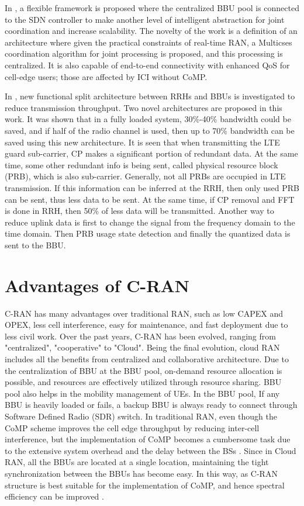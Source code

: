 \begin{multicols}{2}
In \cite{art3-key30}, a flexible framework is proposed where the centralized BBU pool is connected to the SDN controller to make another level of intelligent abstraction for joint coordination and increase scalability. The novelty of the work is a definition of an architecture where given the practical constraints of real-time RAN, a Multicses coordination algorithm for joint processing is proposed, and this processing is centralized. It is also capable of end-to-end connectivity with enhanced QoS for cell-edge users; those are affected by ICI without CoMP.

In \cite{art3-key31}, new functional split architecture between RRHs and BBUs is investigated to reduce transmission throughput. Two novel architectures are proposed in this work. It was shown that in a fully loaded system, 30\%-40\% bandwidth could be saved, and if half of the radio channel is used, then up to 70\% bandwidth can be saved using this new architecture. It is seen that when transmitting the LTE guard sub-carrier, CP makes a significant portion of redundant data. At the same time, some other redundant info is being sent, called physical resource block (PRB), which is also sub-carrier. Generally, not all PRBs are occupied in LTE transmission. If this information can be inferred at the RRH, then only used PRB can be sent, thus less data to be sent. At the same time, if CP removal and FFT is done in RRH, then 50\% of less data will be transmitted. Another way to reduce uplink data is first to change the signal from the frequency domain to the time domain. Then PRB usage state detection and finally the quantized data is sent to the BBU.

\section{Advantages of C-RAN}\label{sect03}

C-RAN has many advantages over traditional RAN, such as low CAPEX and OPEX, less cell interference, easy for maintenance, and fast deployment due to less civil work. Over the past years, C-RAN has been evolved, ranging from "centralized", "cooperative" to "Cloud". Being the final evolution, cloud RAN includes all the benefits from centralized and collaborative architecture. Due to the centralization of BBU at the BBU pool, on-demand resource allocation is possible, and resources are effectively utilized through resource sharing. BBU pool also helps in the mobility management of UEs. In the BBU pool, If any BBU is heavily loaded or fails, a backup BBU is always ready to connect through Software Defined Radio (SDR) switch. In traditional RAN, even though the CoMP scheme improves the cell edge throughput by reducing inter-cell interference, but the implementation of CoMP becomes a cumbersome task due to the extensive system overhead and the delay between the BSs \cite{art3-key03}. Since in Cloud RAN, all the BBUs are located at a single location, maintaining the tight synchronization between the BBUs has become easy. In this way, as C-RAN structure is best suitable for the implementation of CoMP, and hence spectral efficiency can be improved \cite{art3-key32}. 


\end{multicols}
